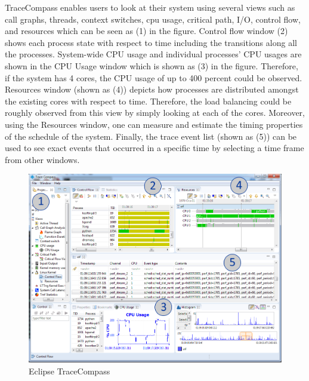 TraceCompass enables users to look at their system using several views such as call graphs, threads, context switches, cpu usage, critical path, I/O, control flow, and resources which can be seen as (1) in the figure. Control flow window (2) shows each process state with respect to time including the transitions along all the processes. System-wide CPU usage and individual processes' CPU usages are shown in the CPU Usage window which is shown as (3) in the figure. Therefore, if the system has 4 cores, the CPU usage of up to 400 percent could be observed. Resources window (shown as (4)) depicts how processes are distributed amongst the existing cores with respect to time. Therefore, the load balancing could be roughly observed from this view by simply looking at each of the cores. Moreover, using the Resources window, one can measure and estimate the timing properties of the schedule of the system. Finally, the trace event list (shown as (5)) can be used to see exact events that occurred in a specific time by selecting a time frame from other windows.

\begin{figure}[!ht]
	\centering
	\includegraphics[scale=0.44]{tracecompass.png}
	\caption{Eclipse TraceCompass}
	\label{fig:tracecompass}
\end{figure}

